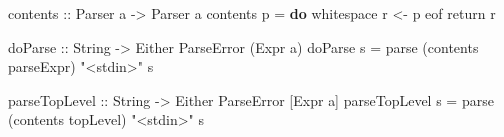 \documentclass[]{article}
\newenvironment{Shaded}{}{}
\newcommand{\KeywordTok}[1]{\textcolor[rgb]{0.00,0.44,0.13}{\textbf{{#1}}}}
\newcommand{\DataTypeTok}[1]{\textcolor[rgb]{0.56,0.13,0.00}{{#1}}}
\newcommand{\StringTok}[1]{\textcolor[rgb]{0.25,0.44,0.63}{{#1}}}
\newcommand{\OtherTok}[1]{\textcolor[rgb]{0.00,0.44,0.13}{{#1}}}
\newcommand{\FunctionTok}[1]{\textcolor[rgb]{0.02,0.16,0.49}{{#1}}}
\newcommand{\NormalTok}[1]{{#1}}
\begin{document}
\begin{Shaded}
\begin{Highlighting}[]
\OtherTok{contents ::} \DataTypeTok{Parser} \NormalTok{a }\OtherTok{->} \DataTypeTok{Parser} \NormalTok{a}
\NormalTok{contents p }\FunctionTok{=} \KeywordTok{do}
    \NormalTok{whitespace}
    \NormalTok{r }\OtherTok{<-} \NormalTok{p}
    \NormalTok{eof}
    \NormalTok{return r}
\end{Highlighting}
\end{Shaded}

\begin{Shaded}
\end{Shaded}

\begin{Shaded}
\begin{Highlighting}[]
\OtherTok{doParse ::} \DataTypeTok{String} \OtherTok{->} \DataTypeTok{Either} \DataTypeTok{ParseError} \NormalTok{(}\DataTypeTok{Expr} \NormalTok{a)}
\NormalTok{doParse s }\FunctionTok{=} \NormalTok{parse (contents parseExpr) }\StringTok{"<stdin>"} \NormalTok{s}
\end{Highlighting}
\end{Shaded}

\begin{Shaded}
\begin{Highlighting}[]
\OtherTok{parseTopLevel ::} \DataTypeTok{String} \OtherTok{->} \DataTypeTok{Either} \DataTypeTok{ParseError} \NormalTok{[}\DataTypeTok{Expr} \NormalTok{a]}
\NormalTok{parseTopLevel s }\FunctionTok{=} \NormalTok{parse (contents topLevel) }\StringTok{"<stdin>"} \NormalTok{s}
\end{Highlighting}
\end{Shaded}
\end{document}
